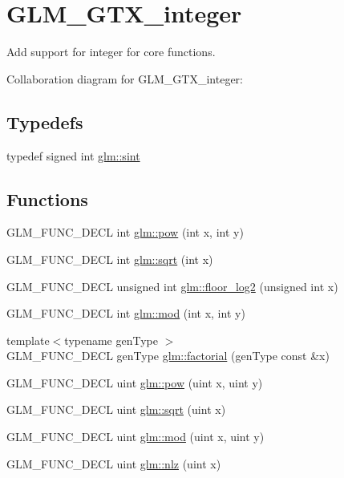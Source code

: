 \hypertarget{group__gtx__integer}{\section{G\-L\-M\-\_\-\-G\-T\-X\-\_\-integer}
\label{group__gtx__integer}
}


Add support for integer for core functions.  


Collaboration diagram for G\-L\-M\-\_\-\-G\-T\-X\-\_\-integer\-:
\subsection*{Typedefs}
\begin{DoxyCompactItemize}
\item 
typedef signed int \hyperlink{group__gtx__integer_ga73643e09d8c6d362418aec541fdb987d}{glm\-::sint}
\end{DoxyCompactItemize}
\subsection*{Functions}
\begin{DoxyCompactItemize}
\item 
G\-L\-M\-\_\-\-F\-U\-N\-C\-\_\-\-D\-E\-C\-L int \hyperlink{group__gtx__integer_ga9642514a44a67afa70966d756f040ca9}{glm\-::pow} (int x, int y)
\item 
G\-L\-M\-\_\-\-F\-U\-N\-C\-\_\-\-D\-E\-C\-L int \hyperlink{group__gtx__integer_ga78e2e68330e91d350fcfc2f4831cad12}{glm\-::sqrt} (int x)
\item 
G\-L\-M\-\_\-\-F\-U\-N\-C\-\_\-\-D\-E\-C\-L unsigned int \hyperlink{group__gtx__integer_ga7011b4e1c1e1ed492149b028feacc00e}{glm\-::floor\-\_\-log2} (unsigned int x)
\item 
G\-L\-M\-\_\-\-F\-U\-N\-C\-\_\-\-D\-E\-C\-L int \hyperlink{group__gtx__integer_gab9d22df91aac4d9eb925a4910f556f1b}{glm\-::mod} (int x, int y)
\item 
{\footnotesize template$<$typename gen\-Type $>$ }\\G\-L\-M\-\_\-\-F\-U\-N\-C\-\_\-\-D\-E\-C\-L gen\-Type \hyperlink{group__gtx__integer_ga8cbd3120905f398ec321b5d1836e08fb}{glm\-::factorial} (gen\-Type const \&x)
\item 
G\-L\-M\-\_\-\-F\-U\-N\-C\-\_\-\-D\-E\-C\-L uint \hyperlink{group__gtx__integer_gaa8229e850c3cc4ad83492fe390ada044}{glm\-::pow} (uint x, uint y)
\item 
G\-L\-M\-\_\-\-F\-U\-N\-C\-\_\-\-D\-E\-C\-L uint \hyperlink{group__gtx__integer_ga457e9efca8339bf918d319e9c55f7c8f}{glm\-::sqrt} (uint x)
\item 
G\-L\-M\-\_\-\-F\-U\-N\-C\-\_\-\-D\-E\-C\-L uint \hyperlink{group__gtx__integer_gab8f9ec0ca93ca90669434224818f0750}{glm\-::mod} (uint x, uint y)
\item 
G\-L\-M\-\_\-\-F\-U\-N\-C\-\_\-\-D\-E\-C\-L uint \hyperlink{group__gtx__integer_gacbe62fd2384464c16ea30ecc4defc11c}{glm\-::nlz} (uint x)
\end{DoxyCompactItemize}


